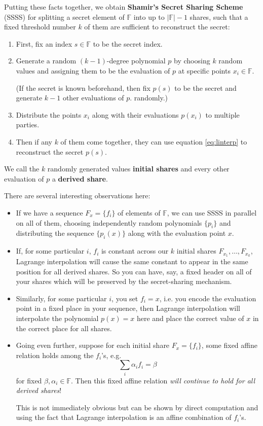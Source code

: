 \documentclass[letterpaper]{article}
\theoremstyle{xxx}
\theoremstyle{evil}
\theoremstyle{yyy}
\theoremstyle{plain}
\theoremstyle{zzz}
\begin{document}
Putting these facts together, we obtain \textbf{Shamir's Secret Sharing
Scheme} (SSSS) for splitting a secret element of $\mathbb{F}$ into up to $|\mathbb{F}|-1$
shares, such that a fixed threshold number $k$ of them are sufficient
to reconstruct the secret:

\begin{enumerate}
\item First, fix an index $s\in \mathbb{F}$ to be the secret index.
\item Generate a random $(k-1)$-degree polynomial $p$ by choosing $k$
random values and assigning them to be the evaluation of $p$ at specific
points $x_i\in \mathbb{F}$.

(If the secret is known beforehand, then fix $p(s)$ to be the secret
and generate $k-1$ other evaluations of $p$. randomly.)
\item Distribute the points $x_i$ along with their evaluations $p(x_i)$
to multiple parties.
\item Then if any $k$ of them come together, they can use equation
\eqref{eq:linterp} to reconstruct the secret $p(s)$.
\end{enumerate}

We call the $k$ randomly generated values \textbf{initial shares} and
every other evaluation of $p$ a \textbf{derived share}.

There are several interesting observations here:
\begin{itemize}
\item If we have a sequence $F_x = \{f_i\}$ of elements of $\mathbb{F}$, we can use
SSSS in parallel on all of them, choosing independently random polynomials
$\{p_i\}$ and distributing the sequence $\{p_i(x)\}$ along with the evaluation
point $x$.
\item If, for some particular $i$, $f_i$ is constant across our $k$ initial
shares $F_{x_1},\ldots,F_{x_k}$, Lagrange interpolation will cause the same
constant to appear in the same position for all derived shares. So you can
have, say, a fixed header on all of your shares which will be preserved by
the secret-sharing mechanism.
\item Similarly, for some particular $i$, you set $f_i=x$, i.e. you encode the
evaluation point in a fixed place in your sequence, then Lagrange interpolation
will interpolate the polynomial $p(x) = x$ here and place the correct value
of $x$ in the correct place for all shares.
\item Going even further, suppose for each initial share $F_x=\{f_i\}$, some fixed
affine relation holds among the $f_i$'s, e.g.
\[ \sum_i \alpha_i f_i = \beta \]
for fixed $\beta,\alpha_i\in \mathbb{F}$. Then this fixed affine relation
\emph{will continue to hold for all derived shares}!

This is not immediately obvious but can be shown by direct computation and
using the fact that Lagrange interpolation is an affine combination of $f_i$'s.
\end{itemize}
\end{document}
